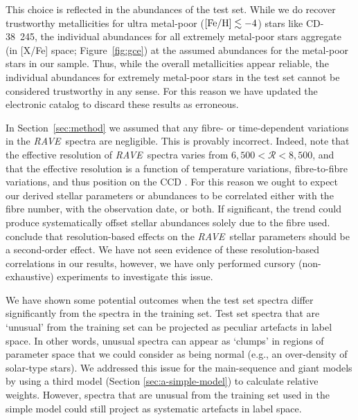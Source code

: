 \documentclass[preprint]{aastex61}
\newcommand{\acronym}[1]{{\small{#1}}}
\newcommand{\project}[1]{\textsl{#1}}
\newcommand{\rave}{\project{\acronym{RAVE}}}
\begin{document}
This choice is reflected in the abundances of the test set.  While we do recover
trustworthy metallicities for ultra metal-poor ($[{\rm Fe/H}] \lesssim -4$) stars like 
CD-38~245, the individual abundances for all extremely metal-poor stars aggregate
(in [X/Fe] space; Figure~\ref{fig:gce}) at the assumed abundances for the metal-poor
stars in our sample.  Thus, while the overall metallicities appear reliable, the 
individual abundances for extremely metal-poor stars in the test set cannot be
considered trustworthy in any sense.  For this reason we have updated the electronic
catalog to discard these results as erroneous.


In Section~\ref{sec:method} we assumed that any fibre- or time-dependent variations
in the \rave\ spectra are negligible.  This is provably incorrect. Indeed,
\citet{Kordopatis_2013} note that the effective resolution of \rave\ spectra
varies from $6{,}500 < \mathcal{R} < 8{,}500$, and that the effective 
resolution is a function of temperature variations, fibre-to-fibre variations,
and thus position on the CCD \citep{Steinmetz_2006}. For this reason we ought
to expect our derived stellar parameters or abundances to be correlated either
with the fibre number, with the observation date, or both.  If significant, 
the trend could produce systematically offset stellar abundances solely due to
the fibre used.  \citet{Kordopatis_2013} conclude that resolution-based effects 
on the \rave\ stellar parameters should be a second-order effect. We have not 
seen evidence of these resolution-based correlations in our results, however, 
we have only performed cursory (non-exhaustive) experiments to investigate 
this issue.


We have shown some potential outcomes when the test set spectra differ 
significantly from the spectra in the training set.  Test set spectra that are
`unusual' from the training set can be projected as peculiar artefacts in 
label space.  In other words, unusual spectra can appear as `clumps' in
regions of parameter space that we could consider as being normal (e.g.,
an over-density of solar-type stars).  We addressed this issue for the main-sequence
and giant models by using a third model (Section \ref{sec:a-simple-model}) to
calculate relative weights.  However, spectra that are unusual from the 
training set used in the simple model could still project as systematic 
artefacts in label space.  
\end{document}
